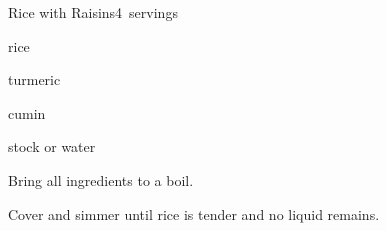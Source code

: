 \begin{recipe}{Rice with Raisins}{}{4~servings}

\begin{ingredients}
\item \C{\threequarter} rice
\item \C{\quarter} 
\item {} turmeric
\item {} cumin
\item \C{2\quarter} stock or water
\end{ingredients}

\begin{directions}
\item Bring all ingredients to a boil.
\item Cover and simmer until rice is tender and no liquid remains.
\end{directions}

\end{recipe}
